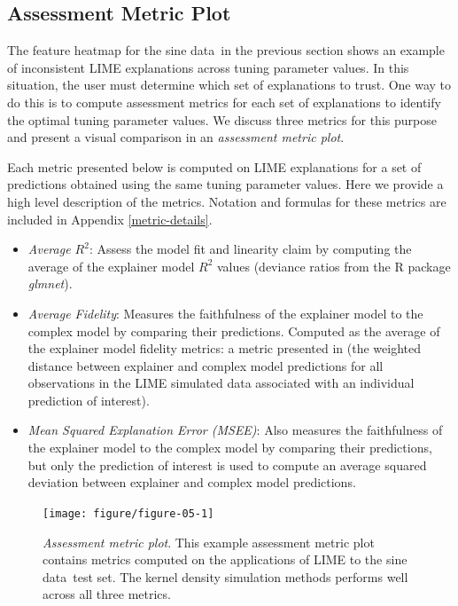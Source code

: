 \documentclass[AMS,STIX2COL]{WileyNJD-v2}\usepackage[]{graphicx}\usepackage[]{color}
\newenvironment{knitrout}{}{} %
\newcommand{\data}{sine data}
\begin{document}
\subsection{Assessment Metric Plot} \label{assess-metric}

The feature heatmap for the \data \ in the previous section shows an example of inconsistent LIME explanations across tuning parameter values. In this situation, the user must determine which set of explanations to trust. One way to do this is to compute assessment metrics for each set of explanations to identify the optimal tuning parameter values. We discuss three metrics for this purpose and present a visual comparison in an \emph{assessment metric plot}.

Each metric presented below is computed on LIME explanations for a set of predictions obtained using the same tuning parameter values. Here we provide a high level description of the metrics. Notation and formulas for these metrics are included in Appendix \ref{metric-details}.

\begin{itemize}
\item \emph{Average $R^2$}: Assess the model fit and linearity claim by computing the average of the explainer model $R^2$ values (deviance ratios from the R package \emph{glmnet}).

\item \emph{Average Fidelity}: Measures the faithfulness of the explainer model to the complex model by comparing their predictions. Computed as the average of the explainer model fidelity metrics: a metric presented in \citet{ribeiro:2016} (the weighted distance between explainer and complex model predictions for all observations in the LIME simulated data associated with an individual prediction of interest). 

\item \emph{Mean Squared Explanation Error (MSEE)}: Also measures the faithfulness of the explainer model to the complex model by comparing their predictions, but only the prediction of interest is used to compute an average squared deviation between explainer and complex model predictions.
\end{itemize}

\begin{figure}[!tp]
\begin{knitrout}
\color{fgcolor}

{\centering \texttt{[image: figure/figure-05-1]} 

}



\end{knitrout}
\caption{\emph{Assessment metric plot}. This example assessment metric plot contains metrics  computed on the applications of LIME to the \data \ test set.  The kernel density simulation methods performs well across all three metrics.}
\label{fig:figure-05}
\end{figure}
\end{document}
